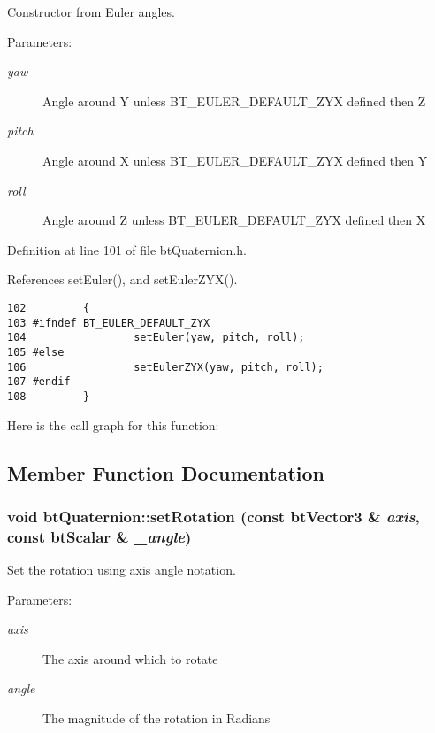 Constructor from Euler angles. 

\begin{Desc}
\item[Parameters:]
\begin{description}
\item[{\em yaw}]Angle around Y unless BT\_\-EULER\_\-DEFAULT\_\-ZYX defined then Z \item[{\em pitch}]Angle around X unless BT\_\-EULER\_\-DEFAULT\_\-ZYX defined then Y \item[{\em roll}]Angle around Z unless BT\_\-EULER\_\-DEFAULT\_\-ZYX defined then X \end{description}
\end{Desc}


Definition at line 101 of file btQuaternion.h.

References setEuler(), and setEulerZYX().

\begin{Code}\begin{verbatim}102         { 
103 #ifndef BT_EULER_DEFAULT_ZYX
104                 setEuler(yaw, pitch, roll); 
105 #else
106                 setEulerZYX(yaw, pitch, roll); 
107 #endif 
108         }
\end{verbatim}
\end{Code}




Here is the call graph for this function:

\subsection{Member Function Documentation}
\hypertarget{classbt_quaternion_de840b704d06ad0092b996b432b8a8a6}{
\subsubsection[setRotation]{\setlength{\rightskip}{0pt plus 5cm}void btQuaternion::setRotation (const btVector3 \& {\em axis}, \/  const btScalar \& {\em \_\-angle})}}
\label{classbt_quaternion_de840b704d06ad0092b996b432b8a8a6}


Set the rotation using axis angle notation. 

\begin{Desc}
\item[Parameters:]
\begin{description}
\item[{\em axis}]The axis around which to rotate \item[{\em angle}]The magnitude of the rotation in Radians \end{description}
\end{Desc}


